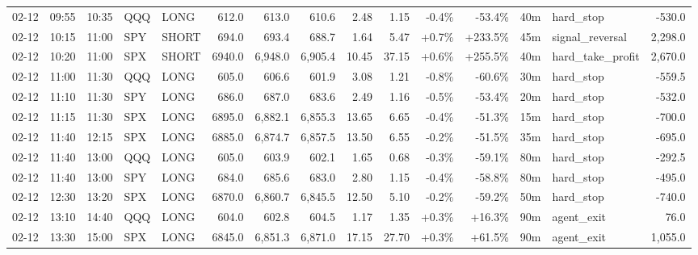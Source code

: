 \documentclass[11pt,a4paper,twoside]{article}
\begin{document}
\begin{landscape}
\begin{center}
\begin{longtable}{>{\color{txtmain}}l l l l l r r r r r r r r >{\color{txtmain}}l r}
02-12 & 09:55 & 10:35 & QQQ & LONG & 612.0 & 613.0 & 610.6 & 2.48 & 1.15 & \textcolor{lossred}{-0.4\%} & \textcolor{lossred}{-53.4\%} & 40m & hard\_stop & \textcolor{lossred}{-530.0} \\
02-12 & 10:15 & 11:00 & SPY & SHORT & 694.0 & 693.4 & 688.7 & 1.64 & 5.47 & \textcolor{wingreen}{+0.7\%} & \textcolor{wingreen}{+233.5\%} & 45m & signal\_reversal & \textcolor{wingreen}{2,298.0} \\
02-12 & 10:20 & 11:00 & SPX & SHORT & 6940.0 & 6,948.0 & 6,905.4 & 10.45 & 37.15 & \textcolor{wingreen}{+0.6\%} & \textcolor{wingreen}{+255.5\%} & 40m & hard\_take\_profit & \textcolor{wingreen}{2,670.0} \\
02-12 & 11:00 & 11:30 & QQQ & LONG & 605.0 & 606.6 & 601.9 & 3.08 & 1.21 & \textcolor{lossred}{-0.8\%} & \textcolor{lossred}{-60.6\%} & 30m & hard\_stop & \textcolor{lossred}{-559.5} \\
02-12 & 11:10 & 11:30 & SPY & LONG & 686.0 & 687.0 & 683.6 & 2.49 & 1.16 & \textcolor{lossred}{-0.5\%} & \textcolor{lossred}{-53.4\%} & 20m & hard\_stop & \textcolor{lossred}{-532.0} \\
02-12 & 11:15 & 11:30 & SPX & LONG & 6895.0 & 6,882.1 & 6,855.3 & 13.65 & 6.65 & \textcolor{lossred}{-0.4\%} & \textcolor{lossred}{-51.3\%} & 15m & hard\_stop & \textcolor{lossred}{-700.0} \\
02-12 & 11:40 & 12:15 & SPX & LONG & 6885.0 & 6,874.7 & 6,857.5 & 13.50 & 6.55 & \textcolor{lossred}{-0.2\%} & \textcolor{lossred}{-51.5\%} & 35m & hard\_stop & \textcolor{lossred}{-695.0} \\
02-12 & 11:40 & 13:00 & QQQ & LONG & 605.0 & 603.9 & 602.1 & 1.65 & 0.68 & \textcolor{lossred}{-0.3\%} & \textcolor{lossred}{-59.1\%} & 80m & hard\_stop & \textcolor{lossred}{-292.5} \\
02-12 & 11:40 & 13:00 & SPY & LONG & 684.0 & 685.6 & 683.0 & 2.80 & 1.15 & \textcolor{lossred}{-0.4\%} & \textcolor{lossred}{-58.8\%} & 80m & hard\_stop & \textcolor{lossred}{-495.0} \\
02-12 & 12:30 & 13:20 & SPX & LONG & 6870.0 & 6,860.7 & 6,845.5 & 12.50 & 5.10 & \textcolor{lossred}{-0.2\%} & \textcolor{lossred}{-59.2\%} & 50m & hard\_stop & \textcolor{lossred}{-740.0} \\
02-12 & 13:10 & 14:40 & QQQ & LONG & 604.0 & 602.8 & 604.5 & 1.17 & 1.35 & \textcolor{wingreen}{+0.3\%} & \textcolor{wingreen}{+16.3\%} & 90m & agent\_exit & \textcolor{wingreen}{76.0} \\
02-12 & 13:30 & 15:00 & SPX & LONG & 6845.0 & 6,851.3 & 6,871.0 & 17.15 & 27.70 & \textcolor{wingreen}{+0.3\%} & \textcolor{wingreen}{+61.5\%} & 90m & agent\_exit & \textcolor{wingreen}{1,055.0} \\

\end{longtable}
\end{center}
\end{landscape}
\end{document}

